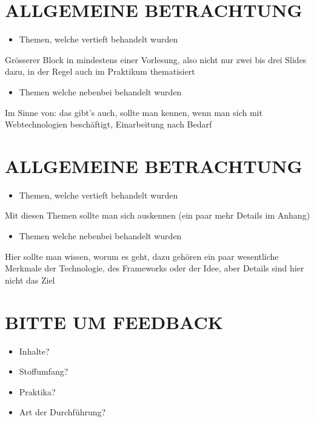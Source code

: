 \documentclass[10pt]{article}
\begin{document}
\section*{ALLGEMEINE BETRACHTUNG}
\begin{itemize}
  \item Themen, welche vertieft behandelt wurden
\end{itemize}

Grösserer Block in mindestens einer Vorlesung, also nicht nur zwei bis drei Slides dazu, in der Regel auch im Praktikum thematisiert

\begin{itemize}
  \item Themen welche nebenbei behandelt wurden
\end{itemize}

Im Sinne von: das gibt's auch, sollte man kennen, wenn man sich mit Webtechnologien beschäftigt, Einarbeitung nach Bedarf

\section*{ALLGEMEINE BETRACHTUNG}
\begin{itemize}
  \item Themen, welche vertieft behandelt wurden
\end{itemize}

Mit diesen Themen sollte man sich auskennen (ein paar mehr Details im Anhang)

\begin{itemize}
  \item Themen welche nebenbei behandelt wurden
\end{itemize}

Hier sollte man wissen, worum es geht, dazu gehören ein paar wesentliche Merkmale der Technologie, des Frameworks oder der Idee, aber Details sind hier nicht das Ziel

\section*{BITTE UM FEEDBACK}
\begin{itemize}
  \item Inhalte?
  \item Stoffumfang?
  \item Praktika?
  \item Art der Durchführung?
\end{itemize}
\end{document}
